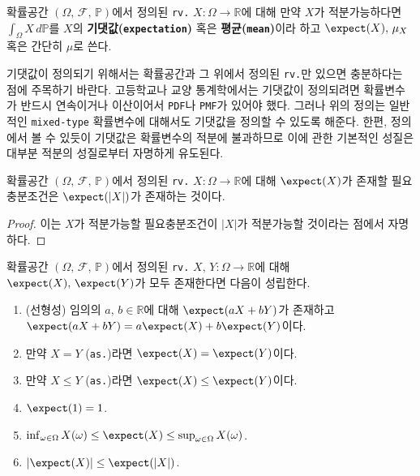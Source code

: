 \begin{definition}
    확률공간 $(\Omega,\,\mathcal{F},\,\mathbb{P})$에서 정의된 \texttt{rv.} $X:\Omega\to\mathbb{R}$에 대해 만약 $X$가 적분가능하다면 $\int_\Omega X\,d\mathbb{P}$를 $X$의 \textbf{기댓값(\texttt{expectation})} 혹은 \textbf{평균(\texttt{mean})}이라 하고 $\expect(X),\,\mu_X$ 혹은 간단히 $\mu$로 쓴다.
\end{definition}

기댓값이 정의되기 위해서는 확률공간과 그 위에서 정의된 \texttt{rv.}만 있으면 충분하다는 점에 주목하기 바란다. 고등학교나 교양 통계학에서는 기댓값이 정의되려면 확률변수가 반드시 연속이거나 이산이어서 \texttt{PDF}나 \texttt{PMF}가 있어야 했다. 그러나 위의 정의는 일반적인 \texttt{mixed-type} 확률변수에 대해서도 기댓값을 정의할 수 있도록 해준다. 한편, 정의에서 볼 수 있듯이 기댓값은 확률변수의 적분에 불과하므로 이에 관한 기본적인 성질은 대부분 적분의 성질로부터 자명하게 유도된다.

\begin{proposition}
    확률공간 $(\Omega,\,\mathcal{F},\,\mathbb{P})$에서 정의된 \texttt{rv.} $X:\Omega\to\mathbb{R}$에 대해 $\expect(X)$가 존재할 필요충분조건은 $\expect(|X|)$가 존재하는 것이다.
\end{proposition}

\begin{proof}
    이는 $X$가 적분가능할 필요충분조건이 $|X|$가 적분가능할 것이라는 점에서 자명하다.
\end{proof}

\begin{theorem}
    확률공간 $(\Omega,\,\mathcal{F},\,\mathbb{P})$에서 정의된 \texttt{rv.} $X,\,Y:\Omega\to\mathbb{R}$에 대해 $\expect(X),\,\expect(Y)$가 모두 존재한다면 다음이 성립한다.
    \begin{enumerate}
        \item (선형성) 임의의 $a,\,b\in\mathbb{R}$에 대해 $\expect(aX+bY)$가 존재하고 $\expect(aX+bY)=a\expect(X)+b\expect(Y)$이다.
        \item 만약 $X=Y$ (\texttt{as.})라면 $\expect(X)=\expect(Y)$이다.
        \item 만약 $X\leq Y$ (\texttt{as.})라면 $\expect(X)\leq\expect(Y)$이다.
        \item $\expect(1)=1$.
        \item $\inf_{\omega\in\Omega}X(\omega)\leq\expect(X)\leq\sup_{\omega\in\Omega}X(\omega)$.
        \item $|\expect(X)|\leq\expect(|X|)$.
    \end{enumerate}
\end{theorem}

